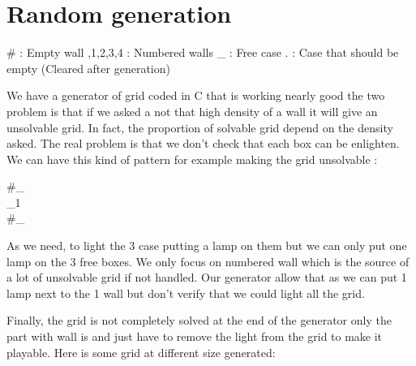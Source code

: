 \documentclass[a4paper]{article}
\begin{document}
\section{Random generation}
\begin{center}
 \# : Empty wall ,1,2,3,4 : Numbered walls  \newline \_ : Free case \qquad   . : Case that should be empty (Cleared after generation)
\end{center}
We have a generator of grid coded in C that is working nearly good the two problem is that if we asked a not that high density of a wall it will give an unsolvable grid. In fact, the proportion of solvable grid depend on the density asked. The real problem is that we don't check that each box can be enlighten. We can have this kind of pattern for example making the grid unsolvable :
\begin{center}
\#\_ \\
\_1  \\
\#\_ \\
\end{center}

As we need, to light the 3 case putting a lamp on them but we can only put one lamp on the 3 free boxes. We only focus on numbered wall which is the source of a lot of unsolvable grid if not handled. Our generator allow that as we can put 1 lamp next to the 1 wall but don't verify that we could light all the grid.

\newpage

Finally, the grid is not completely solved at the end of the generator only the part with wall is and just have to remove the light from the grid to make it playable. 
Here is some grid at different size generated: 
\newline
\end{document}
